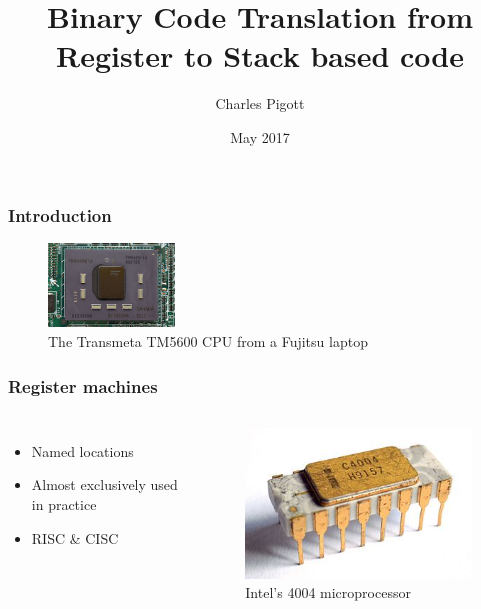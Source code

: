 \documentclass{beamer}
\title{Binary Code Translation from Register to Stack based code}
\author{Charles Pigott}
\institute{Computer Science Dept\\ University of York}
\date{May 2017}
\begin{document}
\frame{\titlepage}

\begin{frame}
  \frametitle{Introduction}

  \begin{figure}
    \includegraphics[width=0.3\textwidth]{imgs/Transmeta_TM5600}
    \caption{The Transmeta TM5600 CPU from a Fujitsu laptop}
  \end{figure}
\end{frame}

\begin{frame}
  \frametitle{Register machines}
   \begin{columns}
       \begin{itemize}
         \item<1-> Named locations
         \item<2-> Almost exclusively used in practice
         \item<3-> RISC \& CISC
       \end{itemize}
       \begin{figure}
         \includegraphics[width=\linewidth]{imgs/Intel_C4004}
         \caption{Intel's 4004 microprocessor}
       \end{figure}
   \end{columns}
\end{frame}
\end{document}
